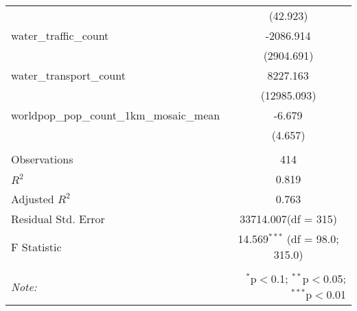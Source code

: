 \begin{table}[!htbp]
\begin{tabular}{@{\extracolsep{5pt}}lc}
  & (42.923) \\
 water_traffic_count & -2086.914$^{}$ \\
  & (2904.691) \\
 water_transport_count & 8227.163$^{}$ \\
  & (12985.093) \\
 worldpop_pop_count_1km_mosaic_mean & -6.679$^{}$ \\
  & (4.657) \\
\hline \\[-1.8ex]
 Observations & 414 \\
 $R^2$ & 0.819 \\
 Adjusted $R^2$ & 0.763 \\
 Residual Std. Error & 33714.007(df = 315)  \\
 F Statistic & 14.569$^{***}$ (df = 98.0; 315.0) \\
\hline
\hline \\[-1.8ex]
\textit{Note:} & \multicolumn{1}{r}{$^{*}$p$<$0.1; $^{**}$p$<$0.05; $^{***}$p$<$0.01} \\
\end{tabular}
\end{table}